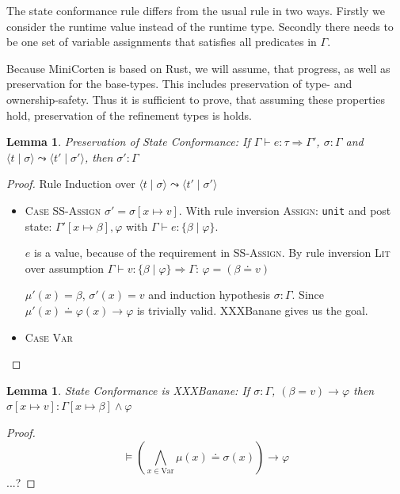 \documentclass{book}
\newcommand{\code}[1]{\texttt{#1}}
\newcommand{\tuple}[2]{\langle #1 \mid #2 \rangle}
\newtheorem{lemma}[theorem]{Lemma}
\theoremstyle{definition}
\begin{document}
The state conformance rule differs from the usual rule in two ways. Firstly we consider the runtime value instead of the runtime type. Secondly there needs to be one set of variable assignments that satisfies all predicates in $\Gamma$.

Because MiniCorten is based on Rust, we will assume, that progress, as well as preservation for the base-types. This includes preservation of type- and ownership-safety. Thus it is sufficient to prove, that assuming these properties hold, preservation of the refinement types is holds.


\begin{lemma}
  Preservation of State Conformance: If $\Gamma \vdash e : \tau \Rightarrow \Gamma'$, $\sigma : \Gamma$ and $\tuple{t}{\sigma} \leadsto \tuple{t'}{\sigma'}$, then  $\sigma' : \Gamma$
\end{lemma}


\begin{proof} Rule Induction over $\tuple{t}{\sigma} \leadsto \tuple{t'}{\sigma'}$
\begin{itemize}
  \item \textsc{Case SS-Assign}
    $\sigma' = \sigma[x \mapsto v]$. With rule inversion \textsc{Assign}: \code{unit} and post state: $\Gamma'[x \mapsto \beta], \varphi$ with $\Gamma \vdash e : \{ \beta \mid \varphi \}$.

    $e$ is a value, because of the requirement in \textsc{SS-Assign}. By rule inversion \textsc{Lit} over assumption $\Gamma \vdash v: \{ \beta \mid \varphi \} \Rightarrow \Gamma$: $\varphi = (\beta \doteq v)$

    $\mu'(x) = \beta$, $\sigma'(x) = v$ and induction hypothesis $\sigma : \Gamma$. Since $\mu'(x) \doteq \varphi(x) \to \varphi$ is trivially valid. XXXBanane gives us the goal.
  \item \textsc{Case Var}
\end{itemize}
\end{proof}

\begin{lemma}
  State Conformance is XXXBanane: If $\sigma : \Gamma$, $(\beta = v) \to \varphi$ then
    $\sigma[x \mapsto v] : \Gamma[x \mapsto \beta] \wedge \varphi$
\end{lemma}

\begin{proof}
  $$\vDash \left(\bigwedge_{x \in \text{Var}} \mu(x) \doteq \sigma(x)\right) \to \varphi$$
  ...?
\end{proof}
\end{document}
